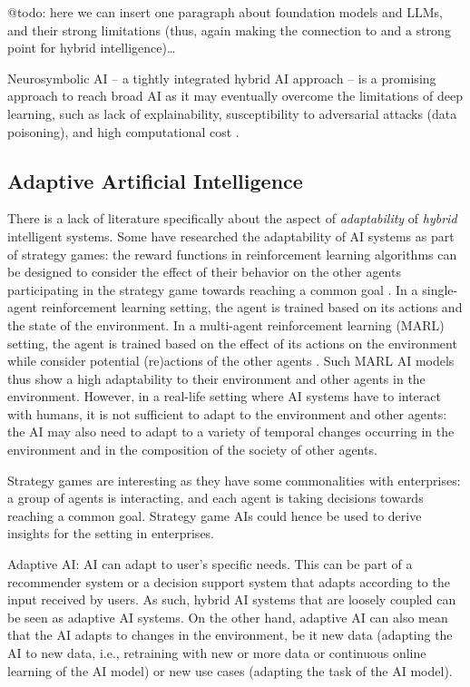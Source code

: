 {\color{purple} @todo: here we can insert one paragraph about foundation models and LLMs, and their strong limitations
(thus, again making the connection to and a strong point for hybrid intelligence)\dots}

Neurosymbolic AI -- a tightly integrated hybrid
AI approach -- is a promising approach to reach broad AI as it may eventually overcome the limitations of deep learning, such
as lack of explainability, susceptibility to adversarial attacks (data poisoning), and high computational cost
\citep{hochreiterBroadAI2022,garcezNeurosymbolicAI3rd2023}.


\subsection{Adaptive Artificial Intelligence}

There is a lack of literature specifically about the aspect of \textit{adaptability} of \textit{hybrid} intelligent
systems. Some have researched the adaptability of AI systems as part of strategy games: the reward functions in
reinforcement learning algorithms can be designed to consider the effect of their behavior on the other agents
participating in the strategy game towards reaching a common goal \citep{madeiraDesigningReinforcementLearningBased2006}.
In a single-agent reinforcement learning setting, the agent is trained based on its actions and the state of the 
environment. In a multi-agent reinforcement learning (MARL) setting, the agent is trained based on the effect 
of its actions on the environment while consider potential (re)actions of the other agents
\citep{caneseMultiAgentReinforcementLearning2021}. Such MARL AI models thus show a high adaptability to
their environment and other agents in the environment. However, in a real-life setting where AI systems have
to interact with humans, it is not sufficient to adapt to the environment and other agents: the AI may also need
to adapt to a variety of temporal changes occurring in the environment and in the composition of the society
of other agents.



Strategy games are interesting as they have some commonalities with
enterprises: a group of agents is interacting, and each agent is taking decisions towards reaching a common goal.
Strategy game AIs could hence be used to derive insights for the setting in enterprises.

Adaptive AI: AI can adapt to user's specific needs. This can be part of a recommender system or a decision support
system that adapts according to the input received by users. As such, hybrid AI systems that are loosely coupled can 
be seen as adaptive AI systems. On the other hand, adaptive AI can also mean that the AI adapts to changes in the
environment, be it new data (adapting the AI to new data, i.e., retraining with new or more data or continuous online
learning of the AI model) or new use cases (adapting the task of the AI model).

